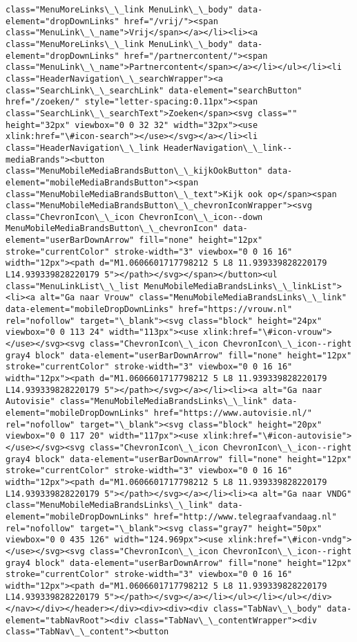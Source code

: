 \documentclass[11pt]{article}
\begin{document}
\begin{Verbatim}[commandchars=\\\{\}]
class="MenuMoreLinks\_\_link MenuLink\_\_body" data-element="dropDownLinks" href="/vrij/"><span class="MenuLink\_\_name">Vrij</span></a></li><li><a class="MenuMoreLinks\_\_link MenuLink\_\_body" data-element="dropDownLinks" href="/partnercontent/"><span class="MenuLink\_\_name">Partnercontent</span></a></li></ul></li><li class="HeaderNavigation\_\_searchWrapper"><a class="SearchLink\_\_searchLink" data-element="searchButton" href="/zoeken/" style="letter-spacing:0.11px"><span class="SearchLink\_\_searchText">Zoeken</span><svg class="" height="32px" viewbox="0 0 32 32" width="32px"><use xlink:href="\#icon-search"></use></svg></a></li><li class="HeaderNavigation\_\_link HeaderNavigation\_\_link--mediaBrands"><button class="MenuMobileMediaBrandsButton\_\_kijkOokButton" data-element="mobileMediaBrandsButton"><span class="MenuMobileMediaBrandsButton\_\_text">Kijk ook op</span><span class="MenuMobileMediaBrandsButton\_\_chevronIconWrapper"><svg class="ChevronIcon\_\_icon ChevronIcon\_\_icon--down MenuMobileMediaBrandsButton\_\_chevronIcon" data-element="userBarDownArrow" fill="none" height="12px" stroke="currentColor" stroke-width="3" viewbox="0 0 16 16" width="12px"><path d="M1.0606601717798212 5 L8 11.939339828220179 L14.939339828220179 5"></path></svg></span></button><ul class="MenuLinkList\_\_list MenuMobileMediaBrandsLinks\_\_linkList"><li><a alt="Ga naar Vrouw" class="MenuMobileMediaBrandsLinks\_\_link" data-element="mobileDropDownLinks" href="https://vrouw.nl" rel="nofollow" target="\_blank"><svg class="block" height="24px" viewbox="0 0 113 24" width="113px"><use xlink:href="\#icon-vrouw"></use></svg><svg class="ChevronIcon\_\_icon ChevronIcon\_\_icon--right gray4 block" data-element="userBarDownArrow" fill="none" height="12px" stroke="currentColor" stroke-width="3" viewbox="0 0 16 16" width="12px"><path d="M1.0606601717798212 5 L8 11.939339828220179 L14.939339828220179 5"></path></svg></a></li><li><a alt="Ga naar Autovisie" class="MenuMobileMediaBrandsLinks\_\_link" data-element="mobileDropDownLinks" href="https://www.autovisie.nl/" rel="nofollow" target="\_blank"><svg class="block" height="20px" viewbox="0 0 117 20" width="117px"><use xlink:href="\#icon-autovisie"></use></svg><svg class="ChevronIcon\_\_icon ChevronIcon\_\_icon--right gray4 block" data-element="userBarDownArrow" fill="none" height="12px" stroke="currentColor" stroke-width="3" viewbox="0 0 16 16" width="12px"><path d="M1.0606601717798212 5 L8 11.939339828220179 L14.939339828220179 5"></path></svg></a></li><li><a alt="Ga naar VNDG" class="MenuMobileMediaBrandsLinks\_\_link" data-element="mobileDropDownLinks" href="http://www.telegraafvandaag.nl" rel="nofollow" target="\_blank"><svg class="gray7" height="50px" viewbox="0 0 435 126" width="124.969px"><use xlink:href="\#icon-vndg"></use></svg><svg class="ChevronIcon\_\_icon ChevronIcon\_\_icon--right gray4 block" data-element="userBarDownArrow" fill="none" height="12px" stroke="currentColor" stroke-width="3" viewbox="0 0 16 16" width="12px"><path d="M1.0606601717798212 5 L8 11.939339828220179 L14.939339828220179 5"></path></svg></a></li></ul></li></ul></div></nav></div></header></div><div><div><div class="TabNav\_\_body" data-element="tabNavRoot"><div class="TabNav\_\_contentWrapper"><div class="TabNav\_\_content"><button 
\end{Verbatim}
\end{document}
